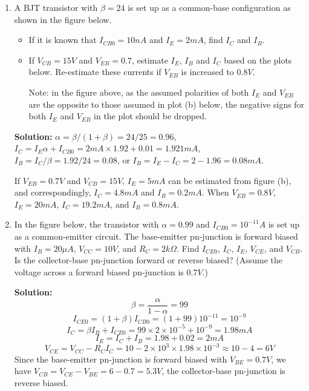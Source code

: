 \begin{enumerate}
\item A BJT transistor with $\beta=24$ is set up as a common-base 
configuration as shown in the figure below. 

\begin{itemize} 
\item If it is known that $I_{CB0}=10 nA$ and $I_E=2 mA$, find $I_C$ 
  and $I_B$.
\item If $V_{CB}=15V$ and $V_{EB}=0.7$, estimate $I_E$, $I_B$ and $I_C$ 
  based on the plots below. Re-estimate these currents if $V_{EB}$ is 
  increased to $0.8V$.

  Note: in the figure above, as the assumed polarities of both $I_E$ and 
  $V_{EB}$ are the opposite to those assumed in plot (b) below, the negative
  signs for both $I_E$ and $V_{EB}$ in the plot should be dropped.

\end{itemize}


{\bf Solution:} $\alpha=\beta/(1+\beta)=24/25=0.96$, 
$I_C=I_E \alpha + I_{CB0}=2 mA \times 1.92+0.01=1.921 mA$,
$I_B=I_C/\beta=1.92/24=0.08$, or $I_B=I_E-I_C=2-1.96=0.08 mA$.

If $V_{EB}=0.7 V$ and $V_{CB}=15V$, $I_E=5 mA$ can be estimated from 
figure (b), and correspondingly, $I_C=4.8 mA$ and $I_B=0.2 mA$. When 
$V_{EB}=0.8 V$, $I_E=20 mA$, $I_C=19.2 mA$, and $I_B=0.8 mA$.

\item In the figure below, the transistor with $\alpha=0.99$ and
  $I_{CB0}=10^{-11} A$ is set up as a common-emitter circuit. The
  base-emitter pn-junction is forward biased with $I_B=20 \mu A$, 
  $V_{CC}=10V$, and $R_C=2k\Omega$. Find $I_{CE0}$, $I_C$, $I_E$, 
  $V_{CE}$, and $V_{CB}$. Is the collector-base pn-junction forward
  or reverse biased? (Assume the voltage across a forward biased 
  pn-junction is $0.7 V$.)
  

{\bf Solution:} 
\[ \beta=\frac{\alpha}{1-\alpha}=99 \]
\[ I_{CE0}=(1+\beta) I_{CB0}=(1+99) 10^{-11}=10^{-9} \]
\[ I_C=\beta I_B+I_{CE0}=99 \times 2 \times 10^{-5} + 10^{-9}=1.98 mA \]
\[ I_E=I_C+I_B=1.98+0.02=2 mA \]
\[ V_{CE}=V_{CC}-R_C I_C=10-2 \times 10^3 \times 1.98 \times 10^{-3}
   \approx 10-4=6 V \]
Since the base-emitter pn-junction is forward biased with $V_{BE}=0.7V$,
we have $V_{CB}=V_{CE}-V_{BE}=6-0.7=5.3 V$, the collector-base pn-junction
is reverse biased.


\end{enumerate}
